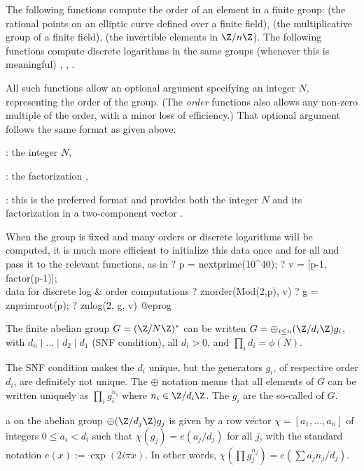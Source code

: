 \label{se:DLfun}

The following functions compute the order of an element in a finite group:
 (the rational points on an elliptic curve defined over a
finite field),  (the multiplicative group of a finite field),
 (the invertible elements in $\Z/n\Z$). The following functions
compute discrete logarithms in the same groups (whenever this is meaningful)
, , .

All such functions allow an optional argument specifying an integer
$N$, representing the order of the group. (The \emph{order} functions also
allows any non-zero multiple of the order, with a minor loss of efficiency.)
That optional argument follows the same format as given above:

\item {}: the integer $N$,

\item {}: the factorization ,

\item {}: this is the preferred format and provides both the
integer $N$ and its factorization in a two-component vector
\kbd{[$N$, fa]}.

When the group is fixed and many orders or discrete logarithms will be
computed, it is much more efficient to initialize this data once and for all
and pass it to the relevant functions, as in
\bprog
? p = nextprime(10^40);
? v = [p-1, factor(p-1)]; \\ data for discrete log & order computations
? znorder(Mod(2,p), v)
? g = znprimroot(p);
? znlog(2, g, v)
@eprog

\label{se:dirichletchar}

The finite abelian group $G = (\Z/N\Z)^*$ can be written $G = \oplus_{i\leq
n} (\Z/d_i\Z) g_i$, with $d_n \mid \dots \mid d_2 \mid d_1$ (SNF condition),
all $d_i > 0$, and $\prod_i d_i = \phi(N)$.

The SNF condition makes the $d_i$ unique, but the generators $g_i$, of
respective order $d_i$, are definitely not unique. The $\oplus$ notation
means that all elements of $G$ can be written uniquely as $\prod_i g_i^{n_i}$
where $n_i \in \Z/d_i\Z$. The $g_i$ are the so-called 
of $G$.

\item a  on the abelian group
$\oplus (\Z/d_j\Z) g_j$
is given by a row vector $\chi = [a_1,\ldots,a_n]$ of integers $0\leq a_i  <
d_i$ such that $\chi(g_j) = e(a_j / d_j)$ for all $j$, with the standard
notation $e(x) := \exp(2i\pi x)$.
In other words,
$\chi(\prod g_j^{n_j}) = e(\sum a_j n_j / d_j)$.

